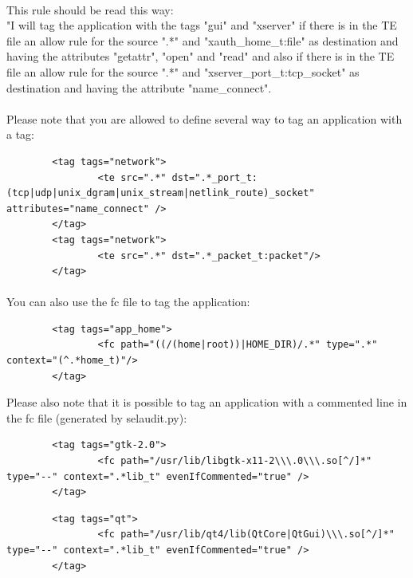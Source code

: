 \paragraph*{}
This rule should be read this way: \\
"I will tag the application with the tags "gui" and "xserver" if there is in the TE file an allow rule for the source ".*"
and "xauth\_home\_t:file" as destination and having the attributes "getattr", "open" and "read" 
and also if there is in the TE file an allow rule for the source ".*"
and "xserver\_port\_t:tcp\_socket" as destination and having the attribute "name\_connect".

\paragraph*{}
Please note that you are allowed to define several way to tag an application with a tag:
\begin{verbatim}
        <tag tags="network">
                <te src=".*" dst=".*_port_t:(tcp|udp|unix_dgram|unix_stream|netlink_route)_socket" attributes="name_connect" />
        </tag>
        <tag tags="network">
                <te src=".*" dst=".*_packet_t:packet"/>
        </tag>
\end{verbatim}

\paragraph*{}
You can also use the fc file to tag the application:
\begin{verbatim}
        <tag tags="app_home">
                <fc path="((/(home|root))|HOME_DIR)/.*" type=".*" context="(^.*home_t)"/>
        </tag>
\end{verbatim}

Please also note that it is possible to tag an application with a commented line in the fc file (generated by selaudit.py):
\begin{verbatim}
        <tag tags="gtk-2.0">
                <fc path="/usr/lib/libgtk-x11-2\\\.0\\\.so[^/]*" type="--" context=".*lib_t" evenIfCommented="true" />
        </tag>
\end{verbatim}

\begin{verbatim}
        <tag tags="qt">
                <fc path="/usr/lib/qt4/lib(QtCore|QtGui)\\\.so[^/]*" type="--" context=".*lib_t" evenIfCommented="true" />
        </tag>
\end{verbatim}
 
